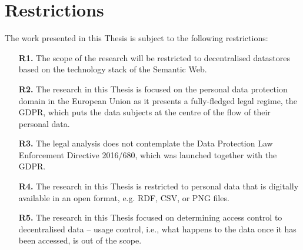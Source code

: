 \section{Restrictions}
\label{sec:restrictions}

The work presented in this Thesis is subject to the following restrictions:

\begin{enumerate}
    \item [\textbf{R1.}] The scope of the research will be restricted to decentralised datastores based on the technology stack of the Semantic Web.
    \item [\textbf{R2.}] The research in this Thesis is focused on the personal data protection domain in the European Union as it presents a fully-fledged legal regime, the GDPR, which puts the data subjects at the centre of the flow of their personal data.
    \item [\textbf{R3.}] The legal analysis does not contemplate the Data Protection Law Enforcement Directive 2016/680, which was launched together with the GDPR.
    \item [\textbf{R4.}] The research in this Thesis is restricted to personal data that is digitally available in an open format, e.g. RDF, CSV, or PNG files.
    \item [\textbf{R5.}] The research in this Thesis focused on determining access control to decentralised data -- usage control, i.e., what happens to the data once it has been accessed, is out of the scope. %
\end{enumerate}